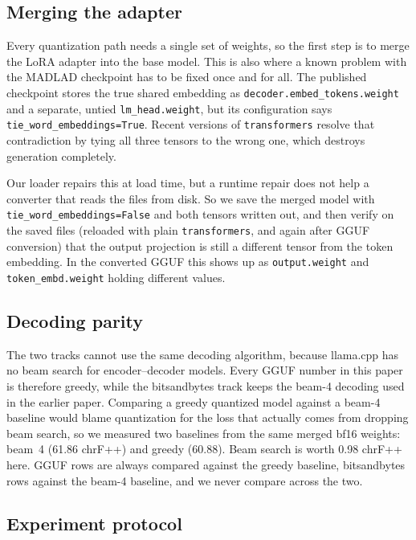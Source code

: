 \documentclass[10pt,twocolumn]{article}
\newcommand{\bfBeamChrf}{61.86}
\newcommand{\bfGreedyChrf}{60.88}
\newcommand{\beamGain}{0.98}
\begin{document}
\subsection{Merging the adapter}

Every quantization path needs a single set of weights, so the first step
is to merge the LoRA adapter into the base model. This is also where a
known problem with the MADLAD checkpoint has to be fixed once and for
all. The published checkpoint stores the true shared embedding as
\texttt{decoder.embed\_tokens.weight} and a separate, untied
\texttt{lm\_head.weight}, but its configuration says
\texttt{tie\_word\_embeddings=True}. Recent versions of
\texttt{transformers} resolve that contradiction by tying all three
tensors to the wrong one, which destroys generation completely.

Our loader repairs this at load time, but a runtime repair does not help
a converter that reads the files from disk. So we save the merged model
with \texttt{tie\_word\_embeddings=False} and both tensors written out,
and then verify on the saved files (reloaded with plain
\texttt{transformers}, and again after GGUF conversion) that the output
projection is still a different tensor from the token embedding. In the
converted GGUF this shows up as \texttt{output.weight} and
\texttt{token\_embd.weight} holding different values.

\subsection{Decoding parity}

The two tracks cannot use the same decoding algorithm, because llama.cpp
has no beam search for encoder--decoder models. Every GGUF number in this
paper is therefore greedy, while the bitsandbytes track keeps the beam-4
decoding used in the earlier paper. Comparing a greedy quantized model
against a beam-4 baseline would blame quantization for the loss that
actually comes from dropping beam search, so we measured two baselines
from the same merged bf16 weights: beam~4 (\bfBeamChrf{} chrF++) and
greedy (\bfGreedyChrf{}). Beam search is worth \beamGain{} chrF++ here.
GGUF rows are always compared against the greedy baseline, bitsandbytes
rows against the beam-4 baseline, and we never compare across the two.

\subsection{Experiment protocol}
\end{document}
